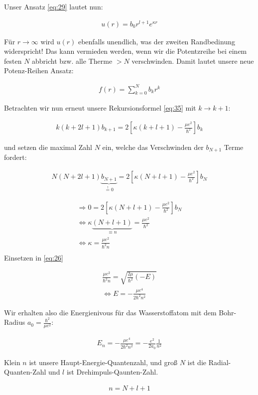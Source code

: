 Unser Ansatz \eqref{eq:29} lautet nun:

\begin{align}
  \label{eq:39}
    u(r) = b_0 r^{l+1} e^{\kappa r}
\end{align}

Für \(r\to\infty\) wird \(u(r)\) ebenfalls unendlich, was der zweiten Randbedinung widerspricht! Das kann vermieden werden, wenn wir die Potentzreihe bei einem festen \(N\) abbricht bzw. alle Therme \(>N\) verschwinden. Damit lautet unsere neue Potenz-Reihen Ansatz:

\begin{align}
  \label{eq:40}
 f(r) = \sum^{N}_{k=0} b_kr^k
\end{align}

Betrachten wir nun erneut unsere Rekursionsformel \eqref{eq:35} mit \(k\to k+1\):

\begin{align}
  \label{eq:41}
      k(k+2l+1)b_{k+1} = 2\left[ \kappa(k+l+1)-\frac{\mu e^2}{\hbar^2}\right] b_{k}
\end{align}

und setzen die maximal Zahl \(N\) ein, welche das Verschwinden der \(b_{N+1}\) Terme fordert:

\begin{align}
  \label{eq:42}
    N(N+2l+1)\underbrace{b_{N+1}}_{\stackrel{!}=0} = 2\left[ \kappa(N+l+1)-\frac{\mu e^2}{\hbar^2}\right] b_{N} 
\end{align}

\begin{align}
  \label{eq:43}
  \Rightarrow 0 = 2\left[ \kappa(N+l+1)-\frac{\mu e^2}{\hbar^2}\right] b_{N} \\
\Leftrightarrow  \kappa \underbrace{(N+l+1)}_{\equiv n} = \frac{\mu e^2}{\hbar^2}\\
\Leftrightarrow  \kappa= \frac{\mu e^2}{\hbar^2 n}\\
\end{align}
Einsetzen in \eqref{eq:26}

\begin{align}
  \label{eq:44}
  \frac{\mu e^2}{\hbar^2 n} = \sqrt{\frac{2\mu}{\hbar^2}(-E)} \\
\Leftrightarrow  E =  - \frac{\mu e^4}{2\hbar^2 n^2} 
\end{align}

Wir erhalten also die Energienivous für das Wasserstoffatom mit dem Bohr-Radius \(a_0 = \frac{\hbar^2}{\mu e^2}\):

\begin{align}
  \label{eq:46}
  \boxed{E_n =  - \frac{\mu e^4}{2\hbar^2 n^2} = -  \frac{e^2}{2a_0}\frac{1}{n^2} }
\end{align}

Klein \(n\) ist unsere Haupt-Energie-Quantenzahl, und groß \(N\) ist die Radial-Quanten-Zahl und \(l\) ist Drehimpuls-Qaunten-Zahl.

\begin{align}
  \label{eq:45}
  n = N+l+1
\end{align}




